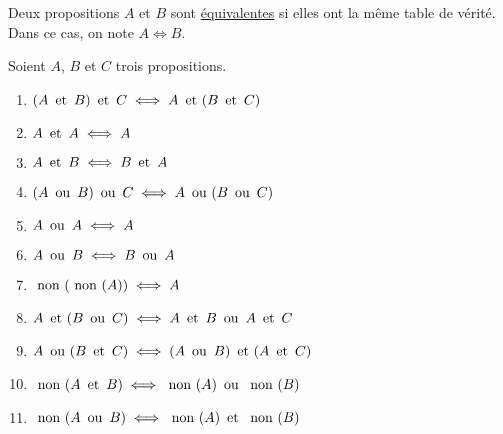 \begin{defn}
	Deux propositions $A$ et $B$ sont \underline{équivalentes} si elles ont la même table de vérité. Dans ce cas, on note $A \iff B$.
\end{defn}

\begin{prop}
	Soient $A$, $B$ et $C$ trois propositions.\\
	\begin{enumerate}
		\item $(A\et B)\et C \iff A \et (B \et C)$
		\item $A \et A \iff A$
		\item $A \et B \iff B \et A$ 
		\item $(A \ou B) \ou C \iff A \ou (B \ou C)$
		\item $A \ou A \iff A$ 
		\item $A \ou B \iff B \ou A$ 
		\item $\non(\non(A)) \iff A$ 
		\item $A \et (B \ou C) \iff A \et B \ou A \et C$ 
		\item $A \ou (B \et C) \iff (A \ou B) \et (A \et C)$
		\item $\non(A\et B) \iff \non(A) \ou \non(B)$
		\item $\non(A\ou B) \iff \non(A)\et\non(B)$
	\end{enumerate}
\end{prop}

